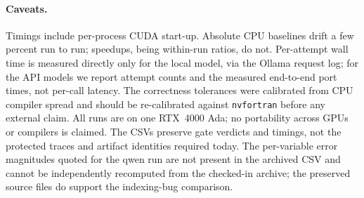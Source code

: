 \documentclass[11pt]{article}
\newcommand{\code}[1]{\texttt{#1}}
\begin{document}
\paragraph{Caveats.} Timings include per-process CUDA start-up. Absolute CPU
baselines drift a few percent run to run; speedups, being within-run ratios, do
not. Per-attempt wall time is measured directly only for the local model, via the
Ollama request log; for the API models we report attempt counts and the measured
end-to-end port times, not per-call latency. The correctness tolerances were
calibrated from CPU compiler spread and should be re-calibrated against
\code{nvfortran} before any external claim. All runs are on one RTX~4000 Ada; no
portability across GPUs or compilers is claimed. The CSVs preserve gate verdicts
and timings, not the protected traces and artifact identities required today.
The per-variable error magnitudes quoted for the qwen run are not present in the
archived CSV and cannot be independently recomputed from the checked-in archive;
the preserved source files do support the indexing-bug comparison.
\end{document}

